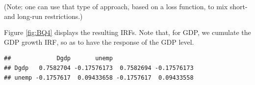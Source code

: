 \documentclass[
]{book}
\newenvironment{Shaded}{\begin{snugshade}}{\end{snugshade}}
\newcommand{\DecValTok}[1]{\textcolor[rgb]{0.00,0.00,0.81}{#1}}
\newcommand{\FunctionTok}[1]{\textcolor[rgb]{0.00,0.00,0.00}{#1}}
\newcommand{\NormalTok}[1]{#1}
\newcommand{\OtherTok}[1]{\textcolor[rgb]{0.56,0.35,0.01}{#1}}
\newcommand{\SpecialCharTok}[1]{\textcolor[rgb]{0.00,0.00,0.00}{#1}}
\theoremstyle{definition}
\theoremstyle{definition}
\theoremstyle{definition}
\theoremstyle{definition}
\theoremstyle{remark}
\begin{document}
(Note: one can use that type of approach, based on a loss function, to mix short- and long-run restrictions.)

Figure \ref{fig:BQ4} displays the resulting IRFs. Note that, for GDP, we cumulate the GDP growth IRF, so as to have the response of the GDP level.

\begin{Shaded}
\end{Shaded}

\begin{verbatim}
##             Dgdp       unemp                       
## Dgdp   0.7582704 -0.17576173  0.7582694 -0.17576173
## unemp -0.1757617  0.09433658 -0.1757617  0.09433558
\end{verbatim}
\end{document}
